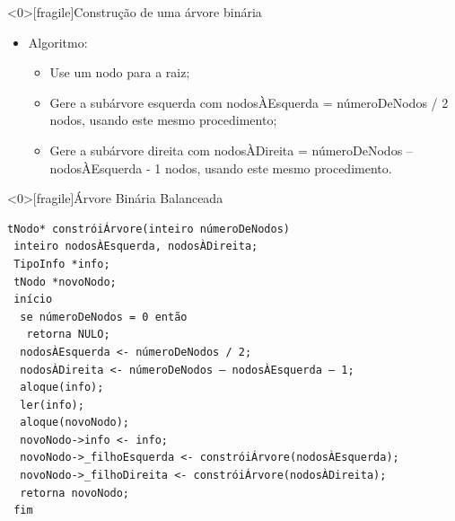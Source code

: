 \documentclass[12pt,table,xcolor={dvipsnames}]{beamer}
\begin{document}
\begin{frame}<0>[fragile]{Construção de uma árvore binária}
          \begin{itemize}
          \item Algoritmo:
          \begin{itemize}
          \item Use um nodo para a raiz;
          \item Gere a subárvore esquerda com nodosÀEsquerda = númeroDeNodos / 2 nodos, usando este mesmo procedimento;
          \item Gere a subárvore direita com nodosÀDireita = númeroDeNodos – nodosÀEsquerda - 1 nodos, usando este mesmo procedimento.
          \end{itemize}
       	  \end{itemize}
\end{frame}

\begin{frame}<0>[fragile]{Árvore Binária Balanceada}
          \begin{lstlisting}
tNodo* constróiÁrvore(inteiro númeroDeNodos)
 inteiro nodosÀEsquerda, nodosÀDireita;
 TipoInfo *info;
 tNodo *novoNodo;
 início
  se númeroDeNodos = 0 então
   retorna NULO;
  nodosÀEsquerda <- númeroDeNodos / 2;
  nodosÀDireita <- númeroDeNodos – nodosÀEsquerda – 1;
  aloque(info);
  ler(info);
  aloque(novoNodo);
  novoNodo->info <- info;
  novoNodo->_filhoEsquerda <- constróiÁrvore(nodosÀEsquerda);
  novoNodo->_filhoDireita <- constróiÁrvore(nodosÀDireita);
  retorna novoNodo;
 fim
		  \end{lstlisting}

\end{frame} 
\end{document}

